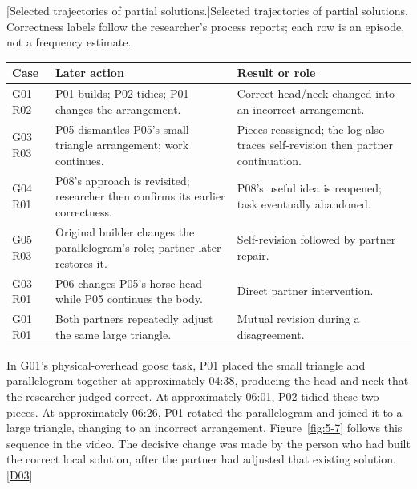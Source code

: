 \par\addvspace{8pt}
\noindent\begin{minipage}{\linewidth}
\begingroup
\centering
{}
\fontsize{10}{12.3}\selectfont
\setlength{\tabcolsep}{2.2pt}
\renewcommand{\arraystretch}{1.18}
[Selected trajectories of partial solutions.]{Selected trajectories of partial solutions. Correctness labels follow the researcher's process reports; each row is an episode, not a frequency estimate.}\label{tab:5-2}
\begin{tabular}{@{}>{\raggedright\arraybackslash}p{23.075mm}>{\raggedright\arraybackslash}p{68.301mm}>{\raggedright\arraybackslash}p{65.532mm}@{}}
\toprule
\textbf{Case} & \textbf{Later action} & \textbf{Result or role} \\
\midrule
G01 R02 & P01 builds; P02 tidies; P01 changes the arrangement. & Correct head/neck changed into an incorrect arrangement. \\
\addlinespace[3pt]
G03 R03 & P05 dismantles P05's small-triangle arrangement; work continues. & Pieces reassigned; the log also traces self-revision then partner continuation. \\
\addlinespace[3pt]
G04 R01 & P08's approach is revisited; researcher then confirms its earlier correctness. & P08's useful idea is reopened; task eventually abandoned. \\
\addlinespace[3pt]
G05 R03 & Original builder changes the parallelogram's role; partner later restores it. & Self-revision followed by partner repair. \\
\addlinespace[3pt]
G03 R01 & P06 changes P05's horse head while P05 continues the body. & Direct partner intervention. \\
\addlinespace[3pt]
G01 R01 & Both partners repeatedly adjust the same large triangle. & Mutual revision during a disagreement. \\
\bottomrule
\end{tabular}
\par\endgroup
\end{minipage}\par\addvspace{8pt}

\begin{samepage}
In G01's physical-overhead goose task, P01 placed the small triangle and parallelogram together at approximately 04:38, producing the head and neck that the researcher judged correct. At approximately 06:01, P02 tidied these two pieces. At approximately 06:26, P01 rotated the parallelogram and joined it to a large triangle, changing to an incorrect arrangement. Figure~\ref{fig:5-7} follows this sequence in the video. The decisive change was made by the person who had built the correct local solution, after the partner had adjusted that existing solution. [\hyperlink{src:D03}{D03}]
\par\end{samepage}


